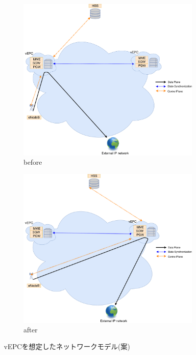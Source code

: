 \documentclass[a4j]{ujarticle}
\begin{document}
\begin{figure}[p]
	\centering
		\begin{subfigure}{1.0\textwidth}
		\centering
			\includegraphics[width=0.5\hsize]{vEPC_before.pdf}
			\caption{before}
			\label{vEPC_before}
		\end{subfigure}
		\begin{subfigure}{1.0\textwidth}
		\centering
			\includegraphics[width=0.5\hsize]{vEPC_after.pdf}
			\caption{after}
			\label{vEPC_after}
		\end{subfigure}
		\caption{vEPCを想定したネットワークモデル(案)}
		\label{vEPC}
\end{figure}
\end{document}

